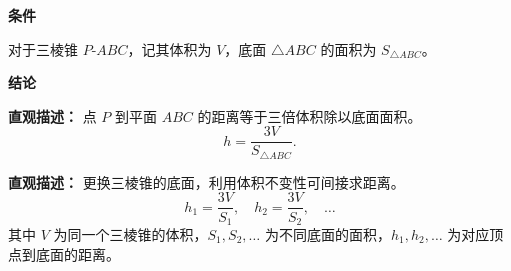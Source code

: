 \begin{statementbox}

	\textbf{\textcolor{CStatement}{条件}}

	\begin{description}[style=nextline, leftmargin=2.8em, labelsep=0.5em, itemsep=0.35em]
		\item[\textbf{\textcolor{CStatement}{条件1（体积底面积已知）：}}]
		      对于三棱锥 $P\text{-}ABC$，记其体积为 $V$，底面 $\triangle ABC$ 的面积为 $S_{\triangle ABC}$。
	\end{description}

	\medskip

	\textbf{\textcolor{CStatement}{结论}}

	\begin{description}[style=nextline, leftmargin=2.8em, labelsep=0.5em, itemsep=0.45em]
		\item[\textbf{\textcolor{CStatement}{结论一（点到面距离公式）：}}]
		      \textbf{\textcolor{CStatement}{直观描述：}}
		      点 $P$ 到平面 $ABC$ 的距离等于三倍体积除以底面面积。
		      \[
			      h = \frac{3V}{S_{\triangle ABC}}.
		      \]

		\item[\textbf{\textcolor{CStatement}{推广结论（换底转化）：}}]
		      \textbf{\textcolor{CStatement}{直观描述：}}
		      更换三棱锥的底面，利用体积不变性可间接求距离。
		      \[
			      h_1 = \frac{3V}{S_1},\quad h_2 = \frac{3V}{S_2},\quad \dots
		      \]
		      其中 $V$ 为同一个三棱锥的体积，$S_1,S_2,\dots$ 为不同底面的面积，$h_1,h_2,\dots$ 为对应顶点到底面的距离。
	\end{description}

\end{statementbox}